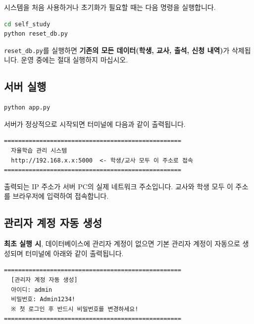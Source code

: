 \documentclass[a4paper,12pt]{article}
\begin{document}
시스템을 처음 사용하거나 초기화가 필요할 때는 다음 명령을 실행합니다.

\begin{lstlisting}[language=bash, caption=데이터베이스 초기화]
cd self_study
python reset_db.py
\end{lstlisting}

\begin{warnbox}
  \texttt{reset\_db.py}를 실행하면 \textbf{기존의 모든 데이터(학생, 교사, 출석, 신청 내역)}가
  삭제됩니다. 운영 중에는 절대 실행하지 마십시오.
\end{warnbox}

\subsection{서버 실행}

\begin{lstlisting}[language=bash, caption=서버 실행]
python app.py
\end{lstlisting}

서버가 정상적으로 시작되면 터미널에 다음과 같이 출력됩니다.

\begin{lstlisting}[caption=정상 실행 출력 예시]
==================================================
  자율학습 관리 시스템
  http://192.168.x.x:5000  <- 학생/교사 모두 이 주소로 접속
==================================================
\end{lstlisting}

\begin{notebox}
  출력되는 IP 주소가 서버 PC의 실제 네트워크 주소입니다.
  교사와 학생 모두 이 주소를 브라우저에 입력하여 접속합니다.
\end{notebox}

\subsection{관리자 계정 자동 생성}

\textbf{최초 실행 시}, 데이터베이스에 관리자 계정이 없으면 기본 관리자 계정이 자동으로 생성되며
터미널에 아래와 같이 출력됩니다.

\begin{lstlisting}[caption=관리자 계정 자동 생성 메시지]
==================================================
  [관리자 계정 자동 생성]
  아이디: admin
  비밀번호: Admin1234!
  ※ 첫 로그인 후 반드시 비밀번호를 변경하세요!
==================================================
\end{lstlisting}
\end{document}
